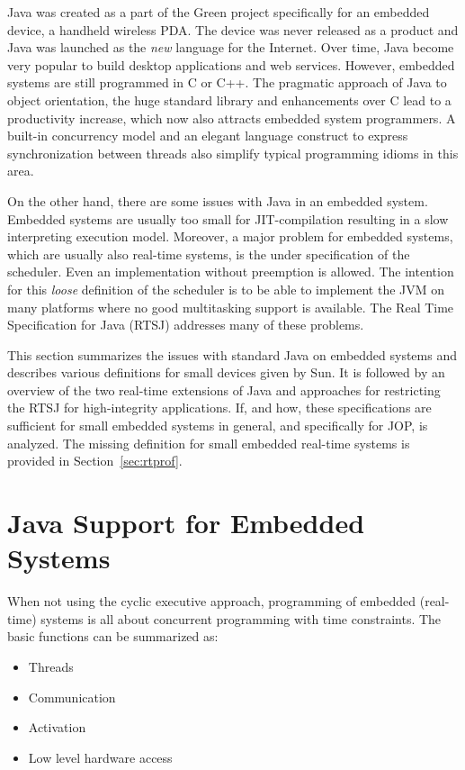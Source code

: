 Java was created as a part of the Green project specifically for an
embedded device, a handheld wireless PDA. The device was never
released as a product and Java was launched as the \emph{new}
language for the Internet. Over time, Java become very popular to
build desktop applications and web services. However, embedded
systems are still programmed in C or C++. The pragmatic approach of
Java to object orientation, the huge standard library and
enhancements over C lead to a productivity increase, which now also
attracts embedded system programmers. A built-in concurrency model
and an elegant language construct to express synchronization between
threads also simplify typical programming idioms in this area.

On the other hand, there are some issues with Java in an embedded
system. Embedded systems are usually too small for JIT-compilation
resulting in a slow interpreting execution model. Moreover, a major
problem for embedded systems, which are usually also real-time
systems, is the under specification of the scheduler. Even an
implementation without preemption is allowed. The intention for this
\textit{loose} definition of the scheduler is to be able to
implement the JVM on many platforms where no good multitasking
support is available. The Real Time Specification for Java (RTSJ)
\cite{rtsj}  addresses many of these problems.

This section summarizes the issues with standard Java on embedded
systems and describes various definitions for small devices given by
Sun. It is followed by an overview of the two real-time extensions of
Java and approaches for restricting the RTSJ for high-integrity
applications. If, and how, these specifications are sufficient for
small embedded systems in general, and specifically for JOP, is
analyzed. The missing definition for small embedded real-time systems
is provided in Section~\ref{sec:rtprof}.

\section{Java Support for Embedded Systems}

When not using the cyclic executive approach, programming of
embedded (real-time) systems is all about concurrent programming
with time constraints. The basic functions can be summarized as:

\begin{itemize}
    \item Threads
    \item Communication
    \item Activation
    \item Low level hardware access
\end{itemize}

